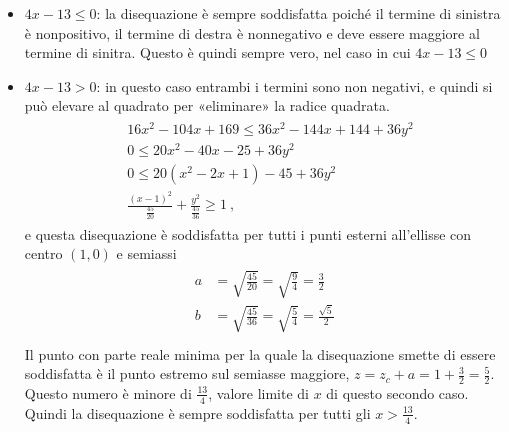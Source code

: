 \documentclass[letterpaper,10pt,italian]{jupyterBook}
\begin{document}
\begin{itemize}
\item {} 
\sphinxAtStartPar
\(4x - 13 \leq 0\): la disequazione è sempre soddisfatta poiché il termine di sinistra è non\sphinxhyphen{}positivo, il termine di destra è non\sphinxhyphen{}negativo e deve essere maggiore  al termine di sinitra. Questo è quindi sempre vero, nel caso in cui \(4 x - 13 \leq 0\)

\item {} 
\sphinxAtStartPar
\(4x - 13 > 0\): in questo caso entrambi i termini sono non negativi, e quindi si può elevare al quadrato per «eliminare» la radice quadrata.
\begin{equation*}
\begin{split}\begin{aligned}
    & 16x^2 - 104 x + 169 \leq 36 x^2 - 144 x + 144 + 36 y^2 \\
    & 0 \leq 20 x^2 - 40 x - 25 + 36 y^2 \\
    & 0 \leq 20 ( x^2 - 2 x + 1 ) - 45 + 36 y^2 \\
    &  \frac{(x-1)^2}{\frac{45}{20}} + \frac{y^2}{\frac{45}{36}} \geq 1 \ ,
  \end{aligned}\end{split}
\end{equation*}
\sphinxAtStartPar
e questa disequazione è soddisfatta per tutti i punti esterni all’ellisse con centro \((1,0)\) e semi\sphinxhyphen{}assi
\begin{equation*}
\begin{split}\begin{aligned}
    a & = \sqrt{\frac{45}{20}} = \sqrt{\frac{9}{4}} = \frac{3}{2} \\
    b & = \sqrt{\frac{45}{36}} = \sqrt{\frac{5}{4}} = \frac{\sqrt{5}}{2} \\
  \end{aligned}\end{split}
\end{equation*}
\sphinxAtStartPar
Il punto con parte reale minima per la quale la disequazione smette di essere soddisfatta è il punto estremo sul semiasse maggiore, \(z = z_c + a = 1 + \frac{3}{2} = \frac{5}{2}\). Questo numero è minore di \(\frac{13}{4}\), valore limite di \(x\) di questo secondo caso. Quindi la disequazione è sempre soddisfatta per tutti gli \(x > \frac{13}{4}\).

\end{itemize}
\end{document}
